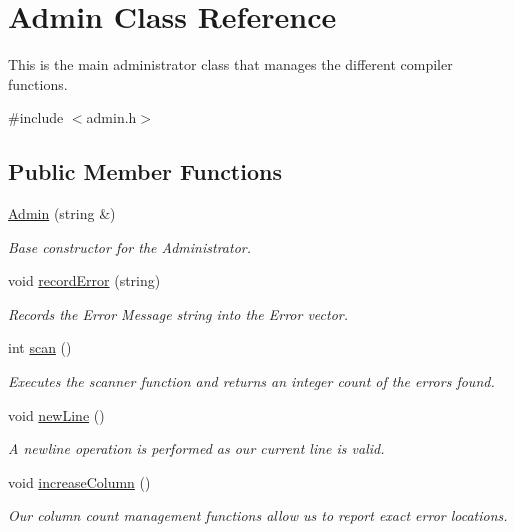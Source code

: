 \hypertarget{classAdmin}{
\section{Admin Class Reference}
\label{classAdmin}
}


This is the main administrator class that manages the different compiler functions.  




{\ttfamily \#include $<$admin.h$>$}

\subsection*{Public Member Functions}
\begin{DoxyCompactItemize}
\item 
\hyperlink{classAdmin_a5b1a3a537008af6065e9cb55522b7a67}{Admin} (string \&)
\begin{DoxyCompactList}\small\item\em Base constructor for the Administrator. \end{DoxyCompactList}\item 
void \hyperlink{classAdmin_a6519bde7fd1ffd997a66987c2417d7bd}{recordError} (string)
\begin{DoxyCompactList}\small\item\em Records the Error Message string into the Error vector. \end{DoxyCompactList}\item 
int \hyperlink{classAdmin_aaa4f711e8151dceab8d90c5f127c6820}{scan} ()
\begin{DoxyCompactList}\small\item\em Executes the scanner function and returns an integer count of the errors found. \end{DoxyCompactList}\item 
void \hyperlink{classAdmin_ae121a9ce2a34ac4075d074c2d1f306c5}{newLine} ()
\begin{DoxyCompactList}\small\item\em A newline operation is performed as our current line is valid. \end{DoxyCompactList}\item 
void \hyperlink{classAdmin_a89653dd68c51b51d9003a2518a56175f}{increaseColumn} ()
\begin{DoxyCompactList}\small\item\em Our column count management functions allow us to report exact error locations. \end{DoxyCompactList}\item 

\end{DoxyCompactItemize}

